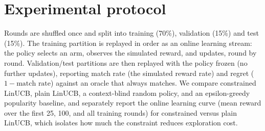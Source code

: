 \section{Experimental protocol}
Rounds are shuffled once and split into training (70\%), validation (15\%)
and test (15\%). The training partition is replayed in order as an online
learning stream: the policy selects an arm, observes the simulated reward,
and updates, round by round. Validation/test partitions are then replayed
with the policy frozen (no further updates), reporting match rate (the
simulated reward rate) and regret ($1 - \text{match rate}$) against an
oracle that always matches. We compare constrained LinUCB, plain LinUCB,
a context-blind random policy, and an epsilon-greedy popularity baseline,
and separately report the online learning curve (mean reward over the
first 25, 100, and all training rounds) for constrained versus plain
LinUCB, which isolates how much the constraint reduces exploration cost.
